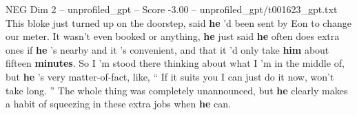 \begin{textsample}{NEG Dim 2 – unprofiled\_gpt – Score -3.00 – unprofiled\_gpt/t001623\_gpt.txt}  \label{ex:f2_neg_024}
This bloke just turned up on the doorstep, said \textbf{he} ’d been sent by Eon to change our meter.
It wasn't even booked or anything, \textbf{he} just said \textbf{he} often does extra ones if \textbf{he} ’s nearby and it ’s convenient, and that it ’d only take \textbf{him} about fifteen \textbf{minutes}.
So I ’m stood there thinking about what I ’m in the middle of, but \textbf{he} ’s very matter-of-fact, like, “ If it suits you I can just do it now, won't take long. ” The whole thing was completely unannounced, but \textbf{he} clearly makes a habit of squeezing in these extra jobs when \textbf{he} can.

\end{textsample}

